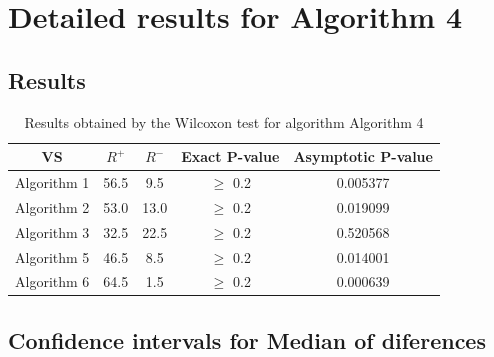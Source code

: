 \documentclass[a4paper,10pt]{article}
\begin{document}
 \clearpage 


\section{Detailed results for Algorithm 4}


\subsection{Results}

\begin{table}[!htp]
\centering\small
\begin{tabular}{
|c|c|c|c|c|}
\hline
 VS & $R^{+}$ & $R^{-}$ & Exact P-value & Asymptotic P-value \\ \hline 
Algorithm 1 & 56.5 & 9.5 & $\geq$ 0.2 & 0.005377\\ \hline 
Algorithm 2 & 53.0 & 13.0 & $\geq$ 0.2 & 0.019099\\ \hline 
Algorithm 3 & 32.5 & 22.5 & $\geq$ 0.2 & 0.520568\\ \hline 
Algorithm 5 & 46.5 & 8.5 & $\geq$ 0.2 & 0.014001\\ \hline 
Algorithm 6 & 64.5 & 1.5 & $\geq$ 0.2 & 0.000639\\ \hline 

\end{tabular}
\caption{Results obtained by the Wilcoxon test for algorithm Algorithm 4}
\end{table}

\subsection{Confidence intervals for Median of diferences}
\end{document}
